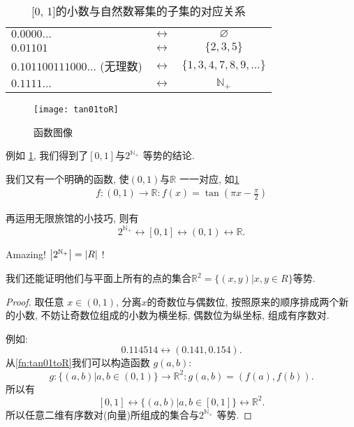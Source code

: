 \begin{table}
  \begin{center}
    \begin{tabular}{lcc}
      \toprule
      $0. 0000\ldots $               & $\leftrightarrow$ &
      $\varnothing$                                                 \\
      $0. 01101$                     & $\leftrightarrow$ & $\{2, 3,
      5\}$                                                          \\
      $0. 101100111000\ldots $ (无理数) & $\leftrightarrow$ & $\{1, 3,
      4, 7, 8, 9,\ldots \}  $                                       \\
      $0. 1111\ldots $               & $\leftrightarrow$ &
      $\mathbb{N}_+$                                                \\
      \bottomrule
    \end{tabular}
    \caption{[0, 1]的小数与自然数幂集的子集的对应关系}
    \label{tbl:01to2N}
  \end{center}
\end{table}

\begin{figure}
  \begin{center}
    \texttt{[image: tan01toR]}
    \caption{函数图像} \label{fig:tan}
  \end{center}
\end{figure}

例如 \cref{tbl:01to2N},
我们得到了$\left[0, 1\right]$与$2^{\mathbb{N}_+} $ 等势的结论.

我们又有一个明确的函数, 使$\left(0, 1\right)$与$\mathbb{R}$ 一一对应, 如\cref{fig:tan}
\begin{align}
  f \colon (0, 1) \to \mathbb{R} \colon f(x) = \tan (\pi x -
  \frac{\pi}{2}) \label{fn:tan01toR}
\end{align}

再运用无限旅馆的小技巧, 则有
\[
  2^{\mathbb{N}_+}\leftrightarrow [0, 1] \leftrightarrow (0, 1)
  \leftrightarrow \mathbb{R}
.\]

Amazing! $\left\lvert 2^{\mathbb{N}_+} \right\rvert = \left\lvert R \right\rvert$ !

我们还能证明他们与平面上所有的点的集合$\mathbb{R}^{2} = \{(x,y)| x, y \in R\} $等势.

\begin{proof}

  取任意 $x \in (0, 1)$, 分离$x$的奇数位与偶数位, 按照原来的顺序排成两个新的小数,
  不妨让奇数位组成的小数为横坐标, 偶数位为纵坐标, 组成有序数对.

  例如:
  \[
    0. 114514 \leftrightarrow (0. 141, 0. 154)
  .\]
  从\cref{fn:tan01toR}我们可以构造函数 $g(a,b)$:
  \[
    g \colon \{(a,b) | a, b \in (0, 1) \}  \to \mathbb{R}^{2}  \colon
    g(a,b) = (f(a), f(b))
  .\]
  所以有
  \[
    [0, 1] \leftrightarrow \{(a,b)| a,b \in [0, 1]\} \leftrightarrow
    \mathbb{R}^{2}
  .\]
  所以任意二维有序数对(向量)所组成的集合与$2^{\mathbb{N}_+} $ 等势.
\end{proof}

